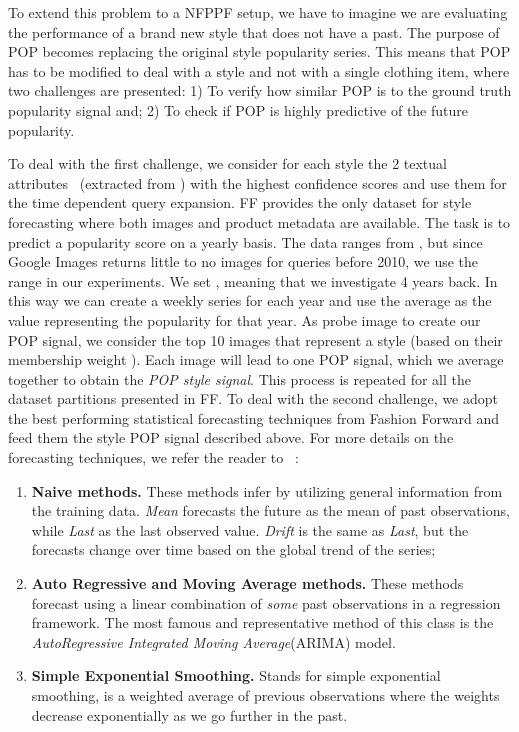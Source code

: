 \documentclass[runningheads]{llncs}
\newcommand{\snamebig}[0] {POP\xspace}
\begin{document}
To extend this problem to a NFPPF setup, we have to imagine we are evaluating the performance of a brand new style that does not have a past. The purpose of \snamebig becomes replacing the original style popularity series. This means that POP has to be modified to deal with a style and not with a single clothing item, where two challenges are presented: 1) To verify how similar \snamebig is to the ground truth popularity signal and; 2) To check if \snamebig is highly predictive of the future popularity.



To deal with the first challenge, we consider for each style  the 2 textual attributes~\cite{liuLQWTcvpr16DeepFashion}  (extracted from ) with the highest confidence scores and use them for the time dependent query expansion. FF provides the only dataset for style forecasting where both images and product metadata are available. The task is to predict a popularity score on a yearly basis. The data ranges from , but since Google Images returns little to no images for queries before 2010, we use the range  in our experiments. We set , meaning that we investigate 4 years back. In this way we can create a weekly series for each year and use the average as the value representing the popularity for that year. As probe image to create our \snamebig signal, we consider the top 10 images  that represent a style (based on their membership weight ). Each image will lead to one \snamebig signal, which we average together to obtain the \emph{\snamebig style signal}. This process is repeated for all the dataset partitions presented in FF. To deal with the second challenge, we adopt the best performing statistical forecasting techniques from Fashion Forward and feed them the style \snamebig signal described above. For more details on the forecasting techniques, we refer the reader to ~\cite{FPAP2,TSA}:
\begin{enumerate}
    \item \textbf{Naive methods.} These methods infer by utilizing general information from the training data. \emph{Mean} forecasts the future as the mean of past observations, while \emph{Last} as the last observed value. \emph{Drift} is the same as \emph{Last}, but the forecasts change over time based on the global trend of the series;
    \item \textbf{Auto Regressive and Moving Average methods.} These methods forecast using a linear combination of \emph{some} past observations in a regression framework. The most famous and representative method of this class is the \emph{AutoRegressive Integrated Moving Average}(ARIMA) model.
    \item \textbf{Simple Exponential Smoothing.} Stands for simple exponential smoothing, is a weighted average of previous observations where the weights decrease exponentially as we go further in the past.
\end{enumerate}
\end{document}
